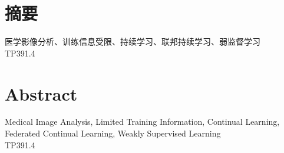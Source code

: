 \setlength{\headsep}{20bp}
\setlength{\emergencystretch}{1em}

\chapter*{摘要}


\vspace{6mm} 医学影像分析、训练信息受限、持续学习、联邦持续学习、弱监督学习 \\
 TP391.4
\cleardoublepage

\chapter*{Abstract}


\vspace{6mm}
 Medical Image Analysis, Limited Training Information, Continual Learning, Federated Continual Learning, Weakly Supervised Learning\\
 TP391.4
\cleardoublepage

